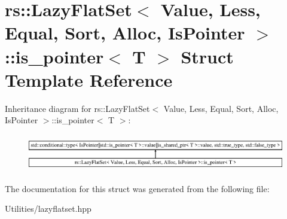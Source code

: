 \hypertarget{structrs_1_1_lazy_flat_set_1_1is__pointer}{\section{rs\+:\+:Lazy\+Flat\+Set$<$ Value, Less, Equal, Sort, Alloc, Is\+Pointer $>$\+:\+:is\+\_\+pointer$<$ T $>$ Struct Template Reference}
\label{structrs_1_1_lazy_flat_set_1_1is__pointer}
}
Inheritance diagram for rs\+:\+:Lazy\+Flat\+Set$<$ Value, Less, Equal, Sort, Alloc, Is\+Pointer $>$\+:\+:is\+\_\+pointer$<$ T $>$\+:\begin{figure}[H]
\begin{center}
\leavevmode
\includegraphics[height=1.644640cm]{structrs_1_1_lazy_flat_set_1_1is__pointer}
\end{center}
\end{figure}


The documentation for this struct was generated from the following file\+:\begin{DoxyCompactItemize}
\item 
Utilities/lazyflatset.\+hpp\end{DoxyCompactItemize}
